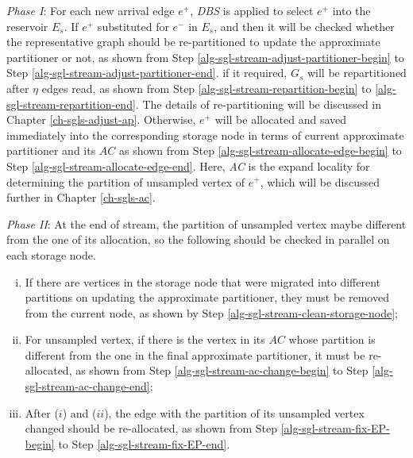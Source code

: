 \documentclass{sig-alternate-2013}
\begin{document}
\textit{Phase I}: For each new arrival edge $e^+$, \textit{DBS} is applied to select $e^+$ into the reservoir $E_s$. If $e^+$ substituted for $e^-$ in $E_s$, and then it will be checked whether the representative graph should be re-partitioned to update the approximate partitioner or not, as shown from Step \ref{alg-sgl-stream-adjust-partitioner-begin} to Step \ref{alg-sgl-stream-adjust-partitioner-end}. if it required, $G_s$ will be repartitioned after $\eta$ edges read, as shown from Step \ref{alg-sgl-stream-repartition-begin} to \ref{alg-sgl-stream-repartition-end}. The details of re-partitioning will be discussed in Chapter \ref{ch-sgls-adjust-ap}.
Otherwise, $e^+$ will be allocated and saved  immediately into the corresponding storage node in terms of current approximate partitioner and its $AC$ as shown from Step \ref{alg-sgl-stream-allocate-edge-begin} to Step \ref{alg-sgl-stream-allocate-edge-end}.
Here, \textit{AC} is the expand locality for determining the partition of unsampled vertex of $e^+$, which will be discussed further in Chapter \ref{ch-sgls-ac}.

\textit{Phase II}:  At the end of stream, the partition of unsampled vertex maybe different from the one of its allocation, so the following should be checked in parallel on each storage node.
\begin{enumerate}[i.]
\item If there are vertices in the storage node that were migrated into different partitions on updating the approximate partitioner, they must be removed from the current node, as shown by Step \ref{alg-sgl-stream-clean-storage-node};
\item For unsampled vertex, if there is the vertex in its $AC$  whose partition is different from the one in the final approximate partitioner, it must be re-allocated, as shown from Step \ref{alg-sgl-stream-ac-change-begin} to Step \ref{alg-sgl-stream-ac-change-end};
\item After ($i$) and ($ii$), the edge with the partition of its unsampled vertex changed should be re-allocated, as shown from Step \ref{alg-sgl-stream-fix-EP-begin}  to Step \ref{alg-sgl-stream-fix-EP-end}.
\end{enumerate}
\end{document}
